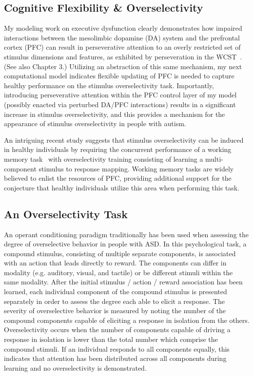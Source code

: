 \subsection{Cognitive Flexibility \& Overselectivity}
My modeling work on executive dysfunction clearly demonstrates how impaired interactions between the mesolimbic dopamine (DA) system and the prefrontal cortex (PFC) can result in perseverative attention to an overly restricted set of stimulus dimensions and features, as exhibited by perseveration in the WCST~\cite{KrieteNoelleICDL06}.  (See also Chapter 3.)  Utilizing an abstraction of this same mechanism, my next computational model indicates flexible updating of PFC is needed to capture healthy performance on the stimulus overselectivity task.  Importantly, introducing perseverative attention within the PFC control layer of my model (possibly enacted via perturbed DA/PFC interactions) results in a significant increase in stimulus overselectivity, and this provides a mechanism for the appearance of stimulus overselectivity in people with autism.   

An intriguing recent study suggests that stimulus overselectivity can be induced in healthy individuals by requiring the concurrent performance of a working memory task~\cite{RefWorks:112} with overselectivity training consisting of learning a multi-component stimulus to response mapping.  Working memory tasks are widely believed to enlist the resources of PFC, providing additional support for the conjecture that healthy individuals utilize this area when performing this task.

\subsection{An Overselectivity Task}
An operant conditioning paradigm traditionally has been used when assessing the degree of overselective behavior in people with ASD.  In this psychological task, a compound stimulus, consisting of multiple separate components, is associated with an action that leads directly to reward.  The components can differ in modality (e.g. auditory, visual, and tactile) or be different stimuli within the same modality.  After the initial stimulus / action / reward association has been learned, each individual component of the compound stimulus is presented separately in order to assess the degree each able to elicit a response.  The severity of overselective behavior is measured by noting the number of the compound components capable of eliciting a response in isolation from the others.  Overselectivity occurs when the number of components capable of driving a response in isolation is lower than the total number which comprise the compound stimuli.  If an individual responds to all components equally, this indicates that attention has been distributed across all components during learning and no overselectivity is demonstrated.   

